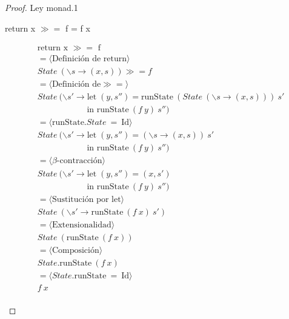 \documentclass[a4paper,12pt]{article}
\begin{document}
\begin{proof}
Ley monad.1
\begin{center}
 return x $\gg=$ f = f x
\end{center}

\hfill
\begin{fleqn}
\begin{equation} 
\begin{split}
  & \text{return x $\gg=$ f }\\
  & =\langle \mbox{Definición de return} \rangle \\
  & State \ (\backslash s \rightarrow (x,s)) \gg= f \\
  & =\langle \mbox{Definición de}\gg= \rangle \\
  & State \ (\backslash s' \rightarrow \mbox{let} \; (y,s'' ) = \mbox{runState} \ (State \ (\backslash s \to (x,s))) \ s' \\
  & \hspace{70pt} \mbox{in  runState} \ (f \ y) \ s'')\\
  & =\langle \mbox{runState}.State \ = \ \mbox{Id}  \rangle \\
  & State \ (\backslash s' \rightarrow \mbox{let} \; (y,s'') = (\backslash s \to (x,s)) \ s' \\
  & \hspace{70pt} \mbox{in  runState} \ (f \ y) \ s'')\\
  & =\langle \beta \mbox{-contracción}  \rangle \\
  & State \ (\backslash s' \rightarrow \mbox{let} \; (y,s'' ) = (x,s') \\
  & \hspace{70pt} \mbox{in  runState} \ (f \ y) \ s'')\\
  & =\langle \mbox{Sustitución por let}  \rangle \\
  & State \ (\backslash s' \rightarrow \mbox{runState} \ (f \ x) \ s')\\
  & =\langle \mbox{Extensionalidad}  \rangle \\
  & State \ (\mbox{runState} \ (f \ x))\\
  & =\langle \mbox{Composición}  \rangle \\
  & State.\mbox{runState} \ (f \ x)\\
  & =\langle State.\mbox{runState} \ = \ \mbox{Id}  \rangle \\
  & f \ x\\
\end{split}
\end{equation}
\end{fleqn}
\end{proof}
\end{document}
